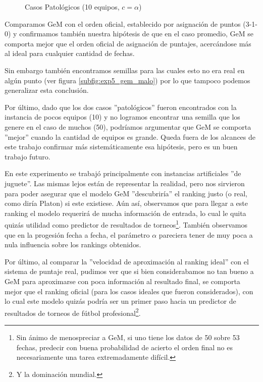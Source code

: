 \begin{figure}[H]
    \centering
    \caption{Casos Patol\'ogicos (10 equipos, $c = \alpha$)}
    \label{fig:exp5_2}
\end{figure}

\par Comparamos GeM con el orden oficial, establecido por asignación de puntos
(3-1-0) y confirmamos tambi\'en nuestra hip\'otesis de que en el caso promedio,
GeM se comporta mejor que el orden oficial de asignaci\'on de puntajes,
acerc\'andose más al ideal para cualquier cantidad de fechas.

\par Sin embargo tambi\'en encontramos semillas para las cuales esto no era real
en alg\'un punto (ver figura \ref{subfig:exp5_gem_malo}) por lo que tampoco
podemos generalizar esta conclusi\'on.

\par Por \'ultimo, dado que los dos casos ''patol\'ogicos'' fueron encontrados
con la instancia de pocos equipos (10) y no logramos encontrar una semilla que
los genere en el caso de muchos (50), podr\'iamos argumentar que GeM se comporta
''mejor'' cuando la cantidad de equipos es grande. Queda fuera de los alcances
de este trabajo confirmar m\'as sistem\'aticamente esa hip\'otesis, pero es un
buen trabajo futuro.

\medskip
\par En este experimento se trabaj\'o principalmente con instancias artificiales
''de juguete''. Las mismas lejos est\'an de representar la realidad, pero nos
sirvieron para poder asegurar que el modelo GeM ''descubrir\'ia'' el ranking
justo (o real, como dir\'ia Platon) si este existiese. A\'un as\'i, observamos
que para llegar a este ranking el modelo requerir\'a de mucha informaci\'on de
entrada, lo cual le quita quiz\'as utilidad como predictor de resultados de
torneos\footnote{Sin \'animo de menospreciar a GeM, si uno tiene los datos de 50
sobre 53 fechas, predecir con buena probabilidad de acierto el orden final no es
necesariamente una tarea extremadamente dif\'icil.}. Tambi\'en observamos que en
la progesi\'on fecha a fecha, el par\'ametro $\alpha$ pareciera tener de muy
poca a nula influencia sobre los rankings obtenidos.

\par Por \'ultimo, al comparar la ''velocidad de aproximaci\'on al ranking ideal'' con el sistema de puntaje real, pudimos ver que si
bien considerabamos no tan bueno a GeM para aproximarse con poca informaci\'on
al resultado final, se comporta mejor que el ranking oficial (para
los casos ideales que fueron considerados), con lo cual este modelo quiz\'as
podr\'ia ser un primer paso hacia un predictor de resultados de torneos de
f\'utbol profesional\footnote{Y la dominaci\'on mundial.}.
